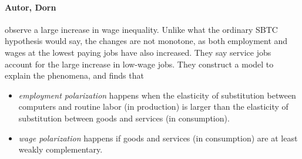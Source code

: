 \documentclass[12pt, a4paper]{article}
\begin{document}
\begin{multicols}{2}
\paragraph{Autor, Dorn} observe a large increase in wage inequality. Unlike what the ordinary SBTC hypothesis would say, the changes are not monotone, as both employment and wages at the lowest paying jobs have also increased. They say service jobs account for the large increase in low-wage jobs. They construct a model to explain the phenomena, and finds that 
\begin{itemize}
\item \textit{employment polarization} happens when the elasticity of substitution between computers and routine labor (in production) is larger than the elasticity of substitution between goods and services (in consumption).
\item \textit{wage polarization} happens if goods and services (in consumption) are at least weakly complementary. 
\end{itemize}



\end{multicols}
\end{document}
